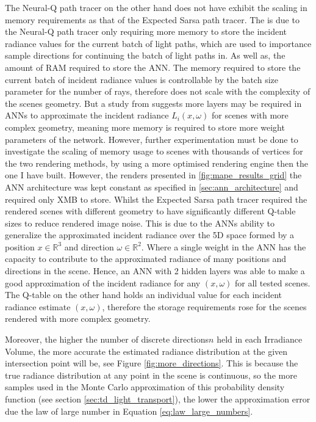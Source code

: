 \documentclass[../dissertation.tex]{subfiles}
\begin{document}
The Neural-Q path tracer on the other hand does not have exhibit the scaling in memory requirements as that of the Expected Sarsa path tracer. The is due to the Neural-Q path tracer only requiring more memory to store the incident radiance values for the current batch of light paths, which are used to importance sample directions for continuing the batch of light paths in. As well as, the amount of RAM required to store the ANN. The memory required to store the current batch of incident radiance values is controllable by the batch size parameter for the number of rays, therefore does not scale with the complexity of the scenes geometry. But a study from \cite{ren2013global} suggests more layers may be required in ANNs to approximate the incident radiance $L_i(x, \omega)$ for scenes with more complex geometry, meaning more memory is required to store more weight parameters of the network. However, further experimentation must be done to investigate the scaling of memory usage to scenes with thousands of vertices for the two rendering methods, by using a more optimised rendering engine then the one I have built. However, the renders presented in \ref{fig:mape_results_grid} the ANN architecture was kept constant as specified in \ref{sec:ann_architecture} and required only XMB to store. Whilst the Expected Sarsa path tracer required the rendered scenes with different geometry to have significantly different Q-table sizes to reduce rendered image noise. This is due to the ANNs ability to generalize the approximated incident radiance over the 5D space formed by a position $x \in \mathbb{R}^3$ and direction $\omega \in \mathbb{R}^2$. Where a single weight in the ANN has the capacity to contribute to the approximated radiance of many positions and directions in the scene. Hence, an ANN with 2 hidden layers was able to make a good approximation of the incident radiance for any $(x, \omega)$ for all tested scenes. The Q-table on the other hand holds an individual value for each incident radiance estimate $(x,\omega)$, therefore the storage requirements rose for the scenes rendered with more complex geometry. %


Moreover, the higher the number of discrete directions$n$ held in each Irradiance Volume, the more accurate the estimated radiance distribution at the given intersection point will be, see Figure \ref{fig:more_directions}. This is because the true radiance distribution at any point in the scene is continuous, so the more samples used in the Monte Carlo approximation of this probability density function (see section \ref{sec:td_light_transport}), the lower the approximation error due the law of large number in Equation \ref{eq:law_large_numbers}. 
\end{document}
